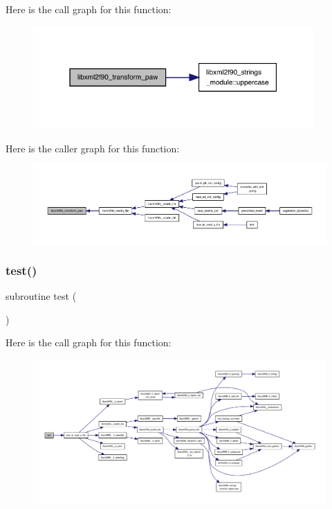 Here is the call graph for this function\+:
\nopagebreak
\begin{figure}[H]
\begin{center}
\leavevmode
\includegraphics[width=304pt]{libxml2f90_8f90__pp_8f90_abf51b9d401b7210767c8a771a9ba2cf4_cgraph}
\end{center}
\end{figure}
Here is the caller graph for this function\+:
\nopagebreak
\begin{figure}[H]
\begin{center}
\leavevmode
\includegraphics[width=350pt]{libxml2f90_8f90__pp_8f90_abf51b9d401b7210767c8a771a9ba2cf4_icgraph}
\end{center}
\end{figure}
\mbox{\label{libxml2f90_8f90__pp_8f90_a538115974c74d38b05d3ff4d4aa7d712}} 
\subsubsection{\texorpdfstring{test()}{test()}}
{\footnotesize\ttfamily subroutine test (\begin{DoxyParamCaption}{ }\end{DoxyParamCaption})}

Here is the call graph for this function\+:
\nopagebreak
\begin{figure}[H]
\begin{center}
\leavevmode
\includegraphics[width=350pt]{libxml2f90_8f90__pp_8f90_a538115974c74d38b05d3ff4d4aa7d712_cgraph}
\end{center}
\end{figure}
